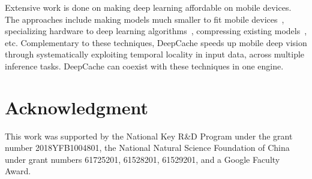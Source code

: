 \documentclass[10pt,acmtog]{acmart}
\newcommand{\framework}{DeepCache\xspace}
\newcommand{\sys}{\framework{}}
\begin{document}
Extensive work is done on making deep learning affordable on mobile devices.
The approaches include making models much smaller to fit mobile devices~\cite{conf/huc/LaneGQ15,conf/icassp/ChenPH14,conf/icassp/VarianiLMMG14,MobileNet},
specializing hardware to deep learning algorithms~\cite{conf/asplos/ChenDSWWCT14,conf/fpga/ZhangLSGXC15,conf/isca/ChenES16,conf/isca/HanLMPPHD16},
compressing existing models~\cite{conf/mobisys/KatevasLPS17,conf/ipsn/LaneBGFJQK16,conf/cvpr/WuLWHC16,conf/nips/DentonZBLF14,conf/mobisys/HanSPAWK16,yao2017deepiot}, etc.
Complementary to these techniques, \framework speeds up mobile deep vision through systematically exploiting temporal locality in input data, across multiple inference tasks.
\sys{} can coexist with these techniques in one engine.

\section*{Acknowledgment}
This work was supported by the National Key R\&D Program under the grant number 2018YFB1004801, the National Natural Science Foundation of China under grant numbers 61725201, 61528201, 61529201, and a Google Faculty Award. 


\balance

\end{document}
